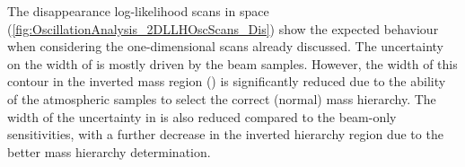 
The disappearance log-likelihood scans in \textendash{} space (\autoref{fig:OscillationAnalysis_2DLLHOscScans_Dis}) show the expected behaviour when considering the one-dimensional scans already discussed. The uncertainty on the width of  is mostly driven by the beam samples. However, the width of this contour in the inverted mass region () is significantly reduced due to the ability of the atmospheric samples to select the correct (normal) mass hierarchy. The width of the uncertainty in  is also reduced compared to the beam-only sensitivities, with a further decrease in the inverted hierarchy region due to the better mass hierarchy determination.

